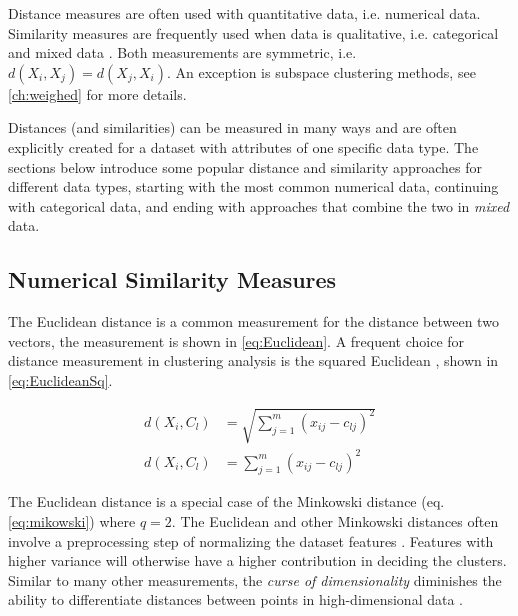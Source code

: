 \documentclass[../report.tex]{subfiles}
\begin{document}
\label{ch:sim}Distance measures are often used with quantitative data, i.e. numerical data. Similarity measures are frequently used when data is qualitative, i.e. categorical and mixed data \cite{Wunsch2005}. Both measurements are symmetric, i.e. $d(X_i, X_j) = d(X_j, X_i)$. An exception is subspace clustering methods, see \cref{ch:weighed} for more details.



Distances (and similarities) can be measured in many ways and are often explicitly created for a dataset with attributes of one specific data type. The sections below introduce some popular distance and similarity approaches for different data types, starting with the most common numerical data, continuing with categorical data, and ending with approaches that combine the two in \textit{mixed} data.

\subsection{Numerical Similarity Measures}

The Euclidean distance is a common measurement for the distance between two vectors, the measurement is shown in \cref{eq:Euclidean}. A frequent choice for distance measurement in clustering analysis is the squared Euclidean \cite{Jain1999, Huang1998, huang2005automated}, shown in \cref{eq:EuclideanSq}.

\begin{align}
  \label{eq:Euclidean}
  d(X_i,C_l) &= \sqrt{\sum^{m}_{j=1}(x_{ij} - c_{lj})^2} \\
  \label{eq:EuclideanSq}
  d(X_i,C_l) &= \sum^{m}_{j=1}(x_{ij} - c_{lj})^2
\end{align}

The Euclidean distance is a special case of the Minkowski distance (eq. \ref{eq:mikowski}) where $q=2$. The Euclidean and other Minkowski distances often involve a preprocessing step of normalizing the dataset features \cite{Jain1999}. Features with higher variance will otherwise have a higher contribution in deciding the clusters. Similar to many other measurements, the \textit{curse of dimensionality} diminishes the ability to differentiate distances between points in high-dimensional data \cite{Parsons2004}.
\end{document}
